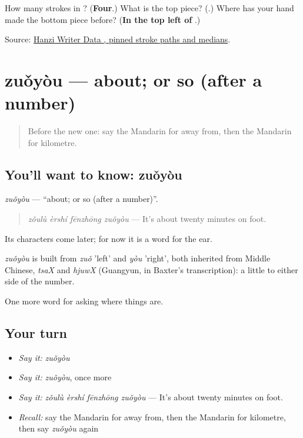 \begin{tcolorbox}[breakable,colback=teal!4,colframe=teal!35!black,title={Before you move on}]
How many strokes in ? (\textbf{Four}.) What is the top piece? (\textbf{}.) Where has your hand made the bottom piece before? (\textbf{In the top left of }.)

Source: \href{https://raw.githubusercontent.com/chanind/hanzi-writer-data/68d10a4b21150cae5e1ebbd223eed289cf32d90c/data/\%E5\%85\%AC.json}{Hanzi Writer Data , pinned stroke paths and medians}.
\end{tcolorbox}
\section[zuǒyòu]{zuǒyòu — about; or so (after a number)}

\label{lesson:ZH-C205-zuoyou}



\begin{quote}
Before the new one: say the Mandarin for away from, then the Mandarin for kilometre.
\end{quote}

\subsection*{You'll want to know: zuǒyòu}
\emph{zuǒyòu} — \textquotedblleft{}about; or so (after a number)\textquotedblright{}.

\begin{quote}
\emph{zǒulù èrshí fēnzhōng zuǒyòu} — It's about twenty minutes on foot.
\end{quote}

Its characters come later; for now it is a word for the ear.

\begin{cousinweb}
\emph{zuǒyòu} is built from \emph{zuǒ} 'left' and \emph{yòu} 'right', both inherited from Middle Chinese, \emph{tsaX} and \emph{hjuwX} (Guangyun, in Baxter's transcription): a little to either side of the number.
\end{cousinweb}

\begin{grammarlens}[title={What you've built}]
One more word for asking where things are.
\end{grammarlens}

\subsection*{Your turn}
\begin{itemize}
\raggedright
  \item \emph{Say it:} \emph{zuǒyòu}
  \item \emph{Say it:} \emph{zuǒyòu}, once more
  \item \emph{Say it:} \emph{zǒulù èrshí fēnzhōng zuǒyòu} — It's about twenty minutes on foot.
  \item \emph{Recall:} say the Mandarin for away from, then the Mandarin for kilometre, then say \emph{zuǒyòu} again
\end{itemize}

